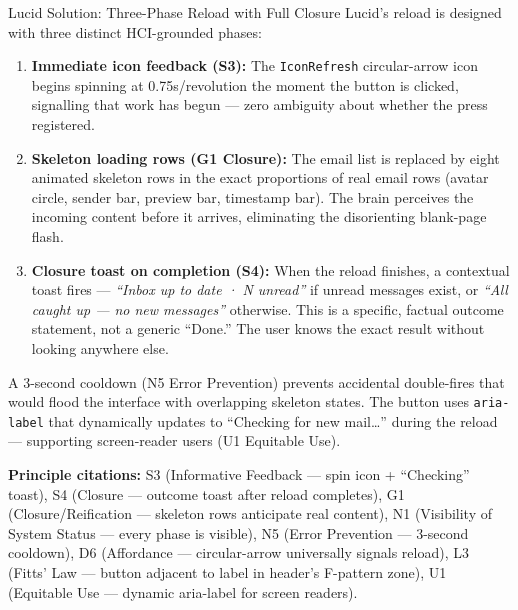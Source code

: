 \documentclass[12pt,a4paper]{report}
\begin{document}
\begin{lucidSolutionBox}{Lucid Solution: Three-Phase Reload with Full Closure}
  Lucid's reload is designed with three distinct HCI-grounded phases:
  \begin{enumerate}[leftmargin=*, itemsep=2pt]
    \item \textbf{Immediate icon feedback (S3):} The \texttt{IconRefresh} circular-arrow
          icon begins spinning at 0.75s/revolution the moment the button is clicked,
          signalling that work has begun — zero ambiguity about whether the press registered.
    \item \textbf{Skeleton loading rows (G1 Closure):} The email list is replaced by
          eight animated skeleton rows in the exact proportions of real email rows
          (avatar circle, sender bar, preview bar, timestamp bar). The brain perceives
          the incoming content before it arrives, eliminating the disorienting blank-page
          flash.
    \item \textbf{Closure toast on completion (S4):} When the reload finishes, a
          contextual toast fires — \textit{``Inbox up to date · N unread''} if unread
          messages exist, or \textit{``All caught up — no new messages''} otherwise.
          This is a specific, factual outcome statement, not a generic ``Done.'' The user
          knows the exact result without looking anywhere else.
  \end{enumerate}
  A 3-second cooldown (N5 Error Prevention) prevents accidental double-fires that
  would flood the interface with overlapping skeleton states. The button uses
  \texttt{aria-label} that dynamically updates to ``Checking for new mail\ldots''
  during the reload — supporting screen-reader users (U1 Equitable Use).
\end{lucidSolutionBox}

\textbf{Principle citations:} S3 (Informative Feedback — spin icon + ``Checking'' toast),
S4 (Closure — outcome toast after reload completes),
G1 (Closure/Reification — skeleton rows anticipate real content),
N1 (Visibility of System Status — every phase is visible),
N5 (Error Prevention — 3-second cooldown),
D6 (Affordance — circular-arrow universally signals reload),
L3 (Fitts' Law — button adjacent to label in header's F-pattern zone),
U1 (Equitable Use — dynamic aria-label for screen readers).
\end{document}
